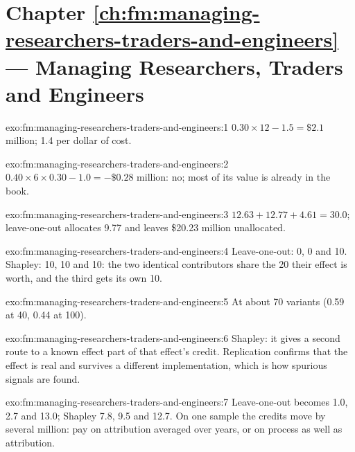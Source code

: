 \section*{Chapter \ref{ch:fm:managing-researchers-traders-and-engineers} --- Managing Researchers, Traders and Engineers}

\begin{solution}{exo:fm:managing-researchers-traders-and-engineers:1}
$0.30\times12-1.5=\$2.1$ million; 1.4 per dollar of cost.
\end{solution}

\begin{solution}{exo:fm:managing-researchers-traders-and-engineers:2}
$0.40\times6\times0.30-1.0=-\$0.28$ million: no; most of its value is already in the book.
\end{solution}

\begin{solution}{exo:fm:managing-researchers-traders-and-engineers:3}
$12.63+12.77+4.61=30.0$; leave-one-out allocates 9.77 and leaves \$20.23 million unallocated.
\end{solution}

\begin{solution}{exo:fm:managing-researchers-traders-and-engineers:4}
Leave-one-out: 0, 0 and 10. Shapley: 10, 10 and 10: the two identical contributors share the 20 their effect is worth, and the third gets its
own 10.
\end{solution}

\begin{solution}{exo:fm:managing-researchers-traders-and-engineers:5}
At about 70 variants (0.59 at 40, 0.44 at 100).
\end{solution}

\begin{solution}{exo:fm:managing-researchers-traders-and-engineers:6}
Shapley: it gives a second route to a known effect part of that effect's credit. Replication confirms that the effect is real and survives a
different implementation, which is how spurious signals are found.
\end{solution}

\begin{solution}{exo:fm:managing-researchers-traders-and-engineers:7}
Leave-one-out becomes 1.0, 2.7 and 13.0; Shapley 7.8, 9.5 and 12.7. On one sample the credits move by several million: pay on attribution averaged
over years, or on process as well as attribution.
\end{solution}


